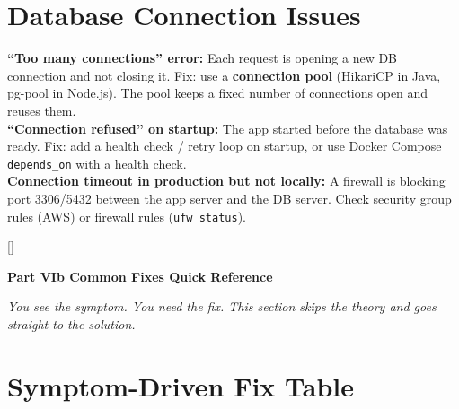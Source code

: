 \documentclass[11pt, letterpaper]{article}
\newcommand{\redsections}{%
  \titleformat{\section}{\large\bfseries\color{sectionred}}{}{0em}{}[\color{sectionred}\titlerule]%
  \titleformat{\subsection}{\normalsize\bfseries\color{sectionred!80!black}}{}{0em}{}%
}
\newcommand{\partbanner}[3]{%
  \begin{tcolorbox}[colback=#1, colframe=#2, boxrule=1.2pt, arc=4pt,
    left=8pt, right=8pt, top=6pt, bottom=6pt]
    \begin{center}{\LARGE\bfseries #3}\end{center}
  \end{tcolorbox}%
}
\begin{document}
\section*{Database Connection Issues}

\begin{tcolorbox}[colback=part4bg, colframe=sectionorange, arc=3pt, boxrule=1pt]
\textbf{``Too many connections'' error:} Each request is opening a new DB connection and not closing it. Fix: use a \textbf{connection pool} (HikariCP in Java, pg-pool in Node.js). The pool keeps a fixed number of connections open and reuses them.\\[4pt]
\textbf{``Connection refused'' on startup:} The app started before the database was ready. Fix: add a health check / retry loop on startup, or use Docker Compose \texttt{depends\_on} with a health check.\\[4pt]
\textbf{Connection timeout in production but not locally:} A firewall is blocking port 3306/5432 between the app server and the DB server. Check security group rules (AWS) or firewall rules (\texttt{ufw status}).
\end{tcolorbox}

\newpage

\redsections
{}
\partbanner{part6bg}{sectionred}{Part VIb \quad Common Fixes Quick Reference}

\vspace{6pt}
\begin{center}\small\itshape
  You see the symptom. You need the fix. This section skips the theory and goes straight to the solution.
\end{center}
\vspace{4pt}

\section*{Symptom-Driven Fix Table}
\end{document}
